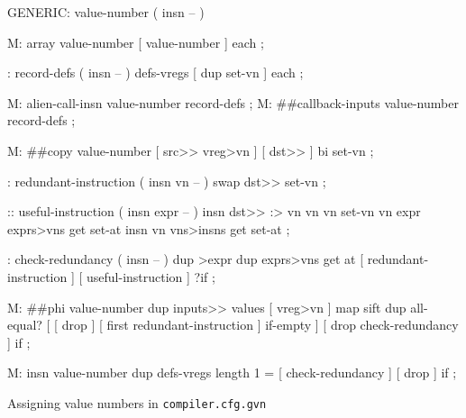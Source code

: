 \centering

  \begin{factorcode}
    GENERIC: value-number ( insn -- )

    M: array value-number [ value-number ] each ;

    : record-defs ( insn -- ) defs-vregs [ dup set-vn ] each ;

    M: alien-call-insn value-number record-defs ;
    M: ##callback-inputs value-number record-defs ;

    M: ##copy value-number [ src>> vreg>vn ] [ dst>> ] bi set-vn ;

    : redundant-instruction ( insn vn -- )
        swap dst>> set-vn ;

    :: useful-instruction ( insn expr -- )
        insn dst>> :> vn
        vn vn set-vn
        vn expr exprs>vns get set-at
        insn vn vns>insns get set-at ;

    : check-redundancy ( insn -- )
        dup >expr dup exprs>vns get at
        [ redundant-instruction ] [ useful-instruction ] ?if ;

    M: ##phi value-number
        dup inputs>> values [ vreg>vn ] map sift
        dup all-equal? [
            [ drop ] [ first redundant-instruction ] if-empty
        ] [ drop check-redundancy ] if ;

    M: insn value-number
        dup defs-vregs length 1 = [ check-redundancy ] [ drop ] if ;
  \end{factorcode}

\caption{Assigning value numbers in \texttt{compiler.cfg.gvn}}

